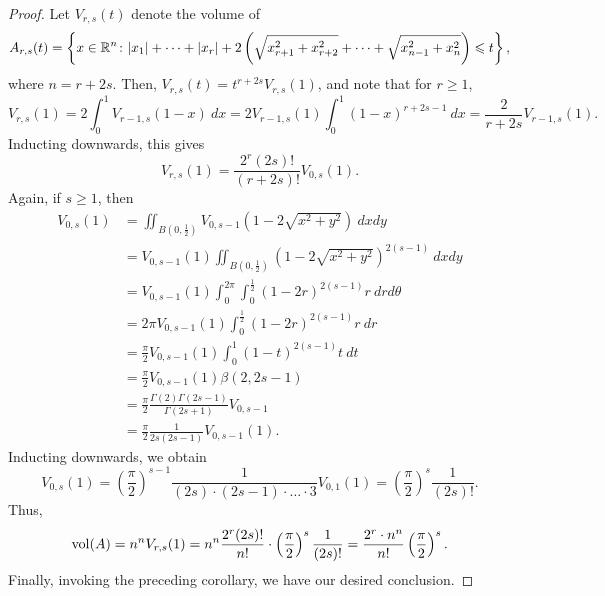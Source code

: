\begin{proof}
    Let $V_{r, s}(t)$ denote the volume of 
    \begin{equation*}
        A_{r, s}(t) = \left\{x\in\mathbb{R}^n\colon |x_1| + \dots + |x_r| + 2\left(\sqrt{x_{r + 1}^2 + x_{r + 2}^2} + \dots + \sqrt{x_{n - 1}^2 + x_n^2}\right)\leqslant t\right\},
    \end{equation*}
    where $n = r + 2s$. Then, $V_{r, s}(t) = t^{r + 2s}V_{r, s}(1)$, and note that for $r\ge 1$,
    \begin{equation*}
        V_{r, s}(1) = 2\int_{0}^1 V_{r-1, s}(1 - x)~dx = 2V_{r - 1, s}(1)\int_0^1(1 - x)^{r + 2s - 1}~dx = \frac{2}{r + 2s} V_{r - 1, s}(1).
    \end{equation*}
    Inducting downwards, this gives 
    \begin{equation*}
        V_{r, s}(1) = \frac{2^r (2s)!}{(r + 2s)!} V_{0, s}(1).
    \end{equation*}
    Again, if $s\ge 1$, then 
    \begin{align*}
        V_{0, s}(1) &= \iint_{B\left(0, \frac12\right)} V_{0, s - 1}\left(1 - 2\sqrt{x^2 + y^2}\right)~dxdy\\
        &= V_{0, s - 1}(1)\iint_{B\left(0, \frac12\right)} \left(1 - 2 \sqrt{x^2 + y^2}\right)^{2(s - 1)}~dxdy\\
        &= V_{0, s - 1}(1)\int_{0}^{2\pi}\int_0^{\frac{1}{2}}\left(1 - 2r\right)^{2(s - 1)}r~drd\theta\\
        &= 2\pi V_{0, s - 1}(1)\int_0^{\frac12} (1 - 2r)^{2(s - 1)}r~dr\\
        &= \frac{\pi}{2} V_{0, s - 1}(1)\int_0^1 (1 - t)^{2(s - 1)}t~dt\\
        &= \frac{\pi}{2} V_{0, s - 1}(1)\beta(2, 2s - 1)\\ 
        &= \frac{\pi}{2}\frac{\Gamma(2)\Gamma(2s - 1)}{\Gamma(2s + 1)} V_{0, s - 1}\\
        &= \frac{\pi}{2}\frac{1}{2s(2s - 1)} V_{0, s - 1}(1).
    \end{align*}
    Inducting downwards, we obtain
    \begin{equation*}
        V_{0, s}(1) = \left(\frac{\pi}{2}\right)^{s - 1}\frac{1}{(2s)\cdot(2s - 1)\cdot\dots\cdot 3}V_{0, 1}(1) = \left(\frac{\pi}{2}\right)^s\frac{1}{(2s)!}.
    \end{equation*}
    Thus, 
    \begin{equation*}
        \operatorname{vol}(A) = n^n V_{r, s}(1) = n^n\frac{2^r(2s)!}{n!}\cdot\left(\frac{\pi}{2}\right)^s\frac{1}{(2s)!} = \frac{2^r\cdot n^n}{n!}\left(\frac{\pi}{2}\right)^s.
    \end{equation*}
    Finally, invoking the preceding corollary, we have our desired conclusion.
\end{proof}

